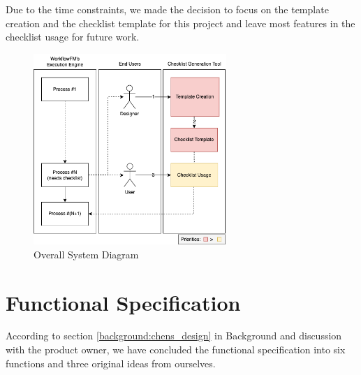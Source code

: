 Due to the time constraints, we made the decision to focus on the template creation and the checklist template for this project and leave most features in the checklist usage for future work.

\begin{figure}[ht!]
    \centering
    \includegraphics[width=0.65\textwidth]{overleaf/images/overall_system_diagram.png}
    \caption{Overall System Diagram}
    \label{fig:overall_system_diagram}
\end{figure}

\section{Functional Specification}
\label{functional_spec}
According to section \ref{background:chens_design} in Background and discussion with the product owner, we have concluded the functional specification into six functions and three original ideas from ourselves.

